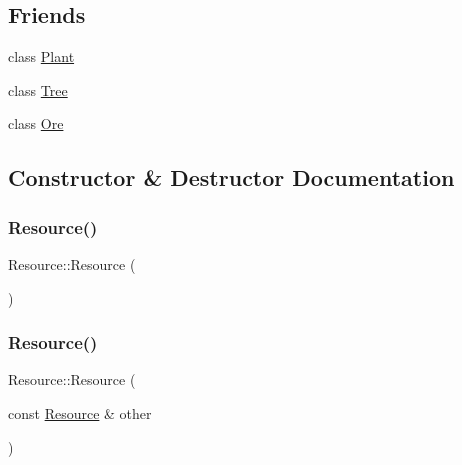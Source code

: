 \subsection*{Friends}
\begin{DoxyCompactItemize}
\item 
class \mbox{\hyperlink{class_resource_aa7d2e19c0c20134c6785f16b997ddc40}{Plant}}
\item 
class \mbox{\hyperlink{class_resource_a4b682814d14447120dd184fd300deade}{Tree}}
\item 
class \mbox{\hyperlink{class_resource_aa5280b133aff1f25ff03e4e4835c2a83}{Ore}}
\end{DoxyCompactItemize}


\subsection{Constructor \& Destructor Documentation}
\mbox{\label{class_resource_a5a87b23dc0327bbf8d53c6f38f637f48}} 
\subsubsection{\texorpdfstring{Resource()}{Resource()}\hspace{0.1cm}{\footnotesize\ttfamily [1/3]}}
{\footnotesize\ttfamily Resource\+::\+Resource (\begin{DoxyParamCaption}{ }\end{DoxyParamCaption})}

\mbox{\label{class_resource_aab50bae0e1d2b39afc578c21e0d0b7b1}} 
\subsubsection{\texorpdfstring{Resource()}{Resource()}\hspace{0.1cm}{\footnotesize\ttfamily [2/3]}}
{\footnotesize\ttfamily Resource\+::\+Resource (\begin{DoxyParamCaption}\item[{const \mbox{\hyperlink{class_resource}{Resource}} \&}]{other }\end{DoxyParamCaption})}

\mbox{\label{class_resource_a9eeccf834c6edda8deec957a9faf5352}} 
